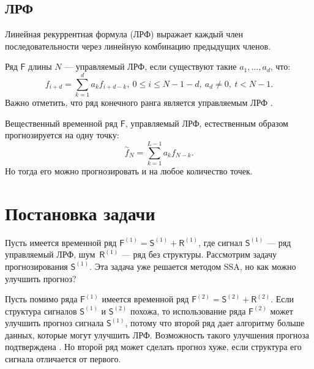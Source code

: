 \documentclass[specialist, substylefile = spbureport.rtx,
    subf,href,colorlinks=true, 12pt]{disser}
\newcommand{\F}{\mathsf{F}}
\newcommand{\sfS}{\mathsf{S}}
\newcommand{\sfR}{\mathsf{R}}
\begin{document}
    \section{ЛРФ}
        Линейная рекуррентная формула (ЛРФ) выражает каждый член последовательности через линейную комбинацию предыдущих членов.

        Ряд $\F$ длины $N$ --- управляемый ЛРФ, если существуют такие $a_1, \dotso, a_d$, что:
        $$f_{i+d} = \sum_{k=1}^d a_k f_{i+d-k},\ 0 \leq i \leq N - 1 - d,\ a_d \neq 0,\ t < N - 1.$$
        Важно отметить, что ряд конечного ранга является управляемым ЛРФ \cite[2.1.2.2, стр. 35]{SSA_with_R}.
        
        

        Вещественный временной ряд $\F$, управляемый ЛРФ, естественным образом прогнозируется на одну точку:
        $$\overset{\sim}{f}_{N} = \sum_{k=1}^{L-1} a_k f_{N-k}.$$
        Но тогда его можно прогнозировать и на любое количество точек.




    \chapter{Постановка задачи}

        Пусть имеется временной ряд $\F^{(1)} = \sfS^{(1)} + \sfR^{(1)}$, где сигнал $\sfS^{(1)}$ --- ряд управляемый ЛРФ, шум~$\sfR^{(1)}$ --- ряд без структуры. Рассмотрим задачу прогнозирования $\sfS^{(1)}$. Эта задача уже решается методом SSA, но как можно улучшить прогноз?

        Пусть помимо ряда $\F^{(1)}$ имеется временной ряд $\F^{(2)} = \sfS^{(2)} + \sfR^{(2)}$.
        Если структура сигналов $\sfS^{(1)}$ и $\sfS^{(2)}$ похожа, то использование ряда $\F^{(2)}$ может улучшить прогноз сигнала $\sfS^{(1)}$, потому что второй ряд дает алгоритму больше данных, которые могут улучшить ЛРФ.
        Возможность такого улучшения прогноза подтверждена \cite[4.3.3.3, стр. 216]{SSA_with_R}.
        Но второй ряд может сделать прогноз хуже, если структура его сигнала отличается от первого.
\end{document}
